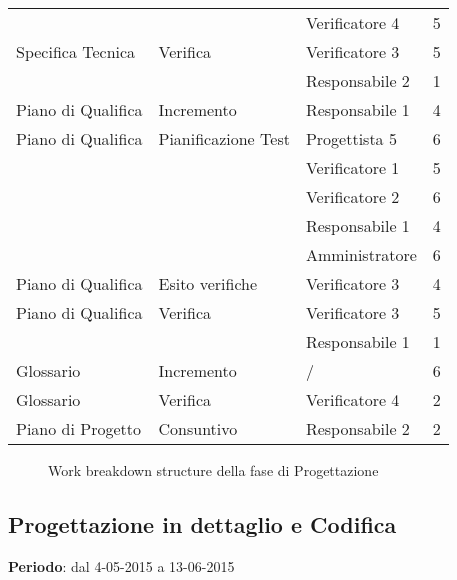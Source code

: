 {{\begin{longtable} [c]{| l | l | l | l |}
		 &	&	Verificatore 4 & 5\\
		Specifica Tecnica & Verifica & Verificatore 3 & 5\\
		 &	&	Responsabile 2 & 1\\
		Piano di Qualifica & Incremento & Responsabile 1 & 4 \\
		Piano di Qualifica & Pianificazione Test & Progettista 5 & 6\\
		&	&	Verificatore 1 & 5\\
		&	&	Verificatore 2 & 6\\
		&	&	Responsabile 1 & 4\\
		&	&	Amministratore & 6\\
		Piano di Qualifica & Esito verifiche & Verificatore 3 & 4 \\
		Piano di Qualifica & Verifica & Verificatore 3 & 5\\
		&	&	Responsabile 1 & 1\\
		Glossario & Incremento & / & 6 \\
		Glossario & Verifica & Verificatore 4 & 2 \\
		Piano di Progetto & Consuntivo & Responsabile 2 & 2\\
	\end{longtable}

	\begin{landscape}
		\thispagestyle{empty}
		\begin{figure}[H]
			\parbox[c][\textwidth][s]{\linewidth}{
			\centering
			\vspace*{\fill}
			\vspace*{\fill}
			\label{fig:wbsProgettazione}
			\caption{Work breakdown structure della fase di Progettazione}}
		\end{figure}
	\end{landscape}
}

\newpage
\subsection{Progettazione in dettaglio e Codifica}{
	\textbf{Periodo}: dal 4-05-2015 a 13-06-2015 \\
	 
}}
